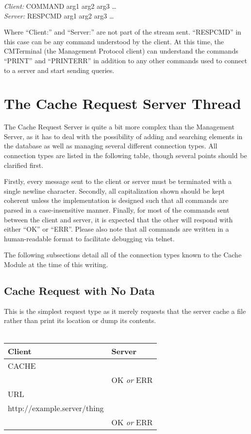 \documentclass[letterpaper]{article}
\begin{document}
\begin{addmargin}[1em]{2em}
\textit{Client:} COMMAND arg1 arg2 arg3 \ldots\\
\textit{Server:} RESPCMD arg1 arg2 arg3 \ldots\\
\end{addmargin}

Where ``Client:'' and ``Server:'' are not part of the stream sent. ``RESPCMD'' in this case can be any command understood by the client. At this time, the CMTerminal (the Management Protocol client) can understand the commands ``PRINT'' and ``PRINTERR'' in addition to any other commands used to connect to a server and start sending queries. 

\section{The Cache Request Server Thread}
The Cache Request Server is quite a bit more complex than the Management Server, as it has to deal with the possibility of adding and searching elements in the database as well as managing several different connection types. All connection types are listed in the following table, though several points should be clarified first.

Firstly, every message sent to the client or server must be terminated with a single newline character. Secondly, all capitalization shown should be kept coherent unless the implementation is designed such that all commands are parsed in a case-insensitive manner. Finally, for most of the commands sent between the client and server, it is expected that the other will respond with either ``OK'' or ``ERR''. Please also note that all commands are written in a human-readable format to facilitate debugging via telnet.

The following subsections detail all of the connection types known to the Cache Module at the time of this writing.\\

\subsection{Cache Request with No Data}
This is the simplest request type as it merely requests that the server cache a file rather than print its location or dump its contents.
\\ %
\\
\begin{tabular}{|l|l|}
\hline
\textbf{Client} & \textbf{Server}\\
\hline
\hline
CACHE &\\
\hline
& OK \textit{or} ERR\\
\hline
URL & \\
http://example.server/thing & \\
\hline
& OK \textit{or} ERR\\
\hline
\end{tabular}
\end{document}
